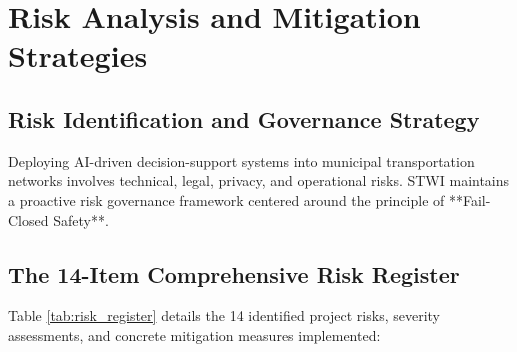 \chapter{Risk Analysis and Mitigation Strategies}
\label{chapter:risk}

\section{Risk Identification and Governance Strategy}
Deploying AI-driven decision-support systems into municipal transportation networks involves technical, legal, privacy, and operational risks. STWI maintains a proactive risk governance framework centered around the principle of **Fail-Closed Safety**.

\section{The 14-Item Comprehensive Risk Register}
Table \ref{tab:risk_register} details the 14 identified project risks, severity assessments, and concrete mitigation measures implemented:


